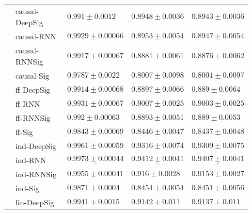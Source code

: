 \begin{tabular}{lllll}
       & causal-DeepSig &                             $ 0.991 \pm 0.0012 $ &                           $ 0.8948 \pm 0.0036 $ &                           $ 0.8943 \pm 0.0036 $ \\
       & causal-RNN &                           $ 0.9929 \pm 0.00066 $ &                           $ 0.8953 \pm 0.0054 $ &                           $ 0.8947 \pm 0.0054 $ \\
       & causal-RNNSig &                           $ 0.9917 \pm 0.00067 $ &                           $ 0.8881 \pm 0.0061 $ &                           $ 0.8876 \pm 0.0062 $ \\
       & causal-Sig &                            $ 0.9787 \pm 0.0022 $ &                           $ 0.8007 \pm 0.0098 $ &                           $ 0.8001 \pm 0.0097 $ \\
       & ff-DeepSig &                           $ 0.9914 \pm 0.00068 $ &                           $ 0.8897 \pm 0.0066 $ &                            $ 0.889 \pm 0.0064 $ \\
       & ff-RNN &                           $ 0.9931 \pm 0.00067 $ &                           $ 0.9007 \pm 0.0025 $ &                           $ 0.9003 \pm 0.0025 $ \\
       & ff-RNNSig &                            $ 0.992 \pm 0.00063 $ &                           $ 0.8893 \pm 0.0051 $ &                            $ 0.889 \pm 0.0053 $ \\
       & ff-Sig &                           $ 0.9843 \pm 0.00069 $ &                           $ 0.8446 \pm 0.0047 $ &                           $ 0.8437 \pm 0.0048 $ \\
       & ind-DeepSig &               $  \mathbf{ 0.9961 \pm 0.00059 } $ &               $  \mathbf{ 0.9316 \pm 0.0074 } $ &               $  \mathbf{ 0.9309 \pm 0.0075 } $ \\
       & ind-RNN &  $  \mathbf{ \underline{ 0.9973 \pm 0.00044 }} $ &  $  \mathbf{ \underline{ 0.9412 \pm 0.0041 }} $ &  $  \mathbf{ \underline{ 0.9407 \pm 0.0041 }} $ \\
       & ind-RNNSig &                           $ 0.9955 \pm 0.00041 $ &                            $ 0.916 \pm 0.0028 $ &                           $ 0.9153 \pm 0.0027 $ \\
       & ind-Sig &                            $ 0.9871 \pm 0.0004 $ &                           $ 0.8454 \pm 0.0054 $ &                           $ 0.8451 \pm 0.0056 $ \\
       & lin-DeepSig &                            $ 0.9941 \pm 0.0015 $ &                            $ 0.9142 \pm 0.011 $ &                            $ 0.9137 \pm 0.011 $ \\

\end{tabular}

